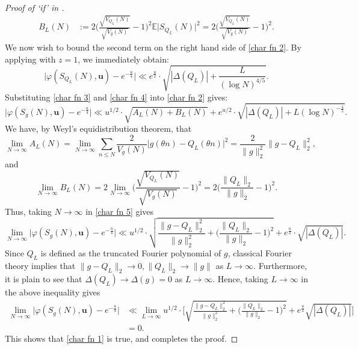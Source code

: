 \documentclass[12pt]{amsart}
\renewcommand{\leq}{\leqslant}
\numberwithin{equation}{section}
\theoremstyle{plain}
\theoremstyle{definition}
\newcommand{\E}{\mathbb{E}}
\renewcommand{\phi}{\varphi}
\begin{document}
\begin{proof}[Proof of `if' in ]
\begin{align*}
			B_L(N) &:=  2\bigg(\frac{\sqrt{V_{Q_L}(N)}}{\sqrt{V_{g}(N)}} - 1\bigg)^2 \E \big|S_{Q_L}(N)\big|^2 = 2\bigg(\frac{\sqrt{V_{Q_L}(N)}}{\sqrt{V_{g}(N)}} - 1\bigg)^2.
		\end{align*}
		We now wish to bound the second term on the right hand side of \eqref{char fn 2}. By applying  with $z=1$, we immediately obtain:
		\begin{equation}\label{char fn 4}
			\big|\phi(S_{Q_L}(N),\bm{u})- e^{-\frac{u}{4}}\big| \ll e^{\frac{u}{2}} \cdot \sqrt{|\Delta(Q_L)| + \frac{L}{(\log N)^{4/5}}}.
		\end{equation}
		Substituting \eqref{char fn 3} and \eqref{char fn 4} into \eqref{char fn 2} gives:
		\begin{equation}\label{char fn 5}
			\big|\phi(S_g(N),\bm{u})-e^{-\frac{u}{4}}\big| \ll u^{1/2}\cdot\sqrt{A_L(N) + B_L(N)}+ e^{u/2} \cdot \sqrt{|\Delta(Q_L)| + L(\log N)^{-\frac{4}{5}}}.
		\end{equation}
		We have, by Weyl's equidistribution theorem, that
		$$\lim_{N \to \infty} A_L(N) = \lim_{N \to \infty} \sum_{n \leq N} \frac{2}{V_{g}(N)}   \Big|g(\theta n)-Q_L(\theta n)\Big|^2 = \frac{2}{\|g\|_2^2} \|g-Q_L\|_{2}^2,$$
		and $$\lim_{N \to \infty} B_L(N) = 2 \lim_{N \to \infty} \bigg(\frac{\sqrt{V_{Q_L}(N)}}{\sqrt{V_{g}(N)}} - 1\bigg)^2 =  2\bigg(\frac{\|Q_L\|_2}{\|g\|_2} - 1\bigg)^2.$$
		Thus, taking $N \to \infty$ in \eqref{char fn 5} gives
		\begin{equation}\label{char fn 6}
			\lim_{N \to \infty}\big|\phi(S_g(N),\bm{u})-e^{-\frac{u}{4}}\big| \ll u^{1/2} \cdot \sqrt{\frac{\|g-Q_L\|_{2}^2}{\|g\|_2^2}  +\bigg(\frac{\|Q_L\|_2}{\|g\|_2} - 1\bigg)^2}+ e^{\frac{u}{2}} \cdot \sqrt{|\Delta(Q_L)|}.
		\end{equation}
		Since $Q_L$ is defined as the truncated Fourier polynomial of $g$, classical Fourier theory implies that $\|g - Q_L\|_2 \to 0, \|Q_L\|_2 \to \|g\|$ as $L \to \infty$. Furthermore, it is plain to see that $\Delta(Q_L) \to \Delta(g) = 0$ as $L \to \infty$. Hence, taking $L \to \infty$ in the above inequality gives
		\begin{align*}
			\lim_{N \to \infty}\big|\phi(S_g(N),\bm{u})-e^{-\frac{u}{4}}\big| &\ll \lim_{L \to \infty} u^{1/2}\cdot \bigg[\sqrt{\frac{ \|g-Q_L\|_{2}^2 }{\|g\|_2^2}+ \bigg(\frac{\|Q_L\|_2}{\|g\|_2} - 1\bigg)^2  } + e^{\frac{u}{2}} \sqrt{|\Delta(Q_L)|}\bigg]\\ &= 0.
		\end{align*}
		This shows that \eqref{char fn 1} is true, and completes the proof.
	\end{proof}
\end{document}
